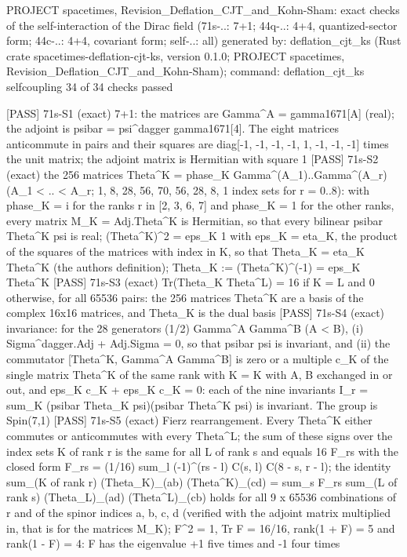 \documentclass[
  10pt,
]{article}
\newenvironment{Shaded}{}{}
\newcommand{\NormalTok}[1]{#1}
\begin{document}
\begin{Shaded}
\begin{Highlighting}[]
\NormalTok{PROJECT spacetimes, Revision\_Deflation\_CJT\_and\_Kohn{-}Sham: exact checks of the self{-}interaction of the Dirac field (71s{-}..: 7+1; 44q{-}..: 4+4, quantized{-}sector form; 44c{-}..: 4+4, covariant form; self{-}..: all)}
\NormalTok{generated by: deflation\_cjt\_ks (Rust crate spacetimes{-}deflation{-}cjt{-}ks, version 0.1.0; PROJECT spacetimes, Revision\_Deflation\_CJT\_and\_Kohn{-}Sham); command: deflation\_cjt\_ks selfcoupling}
\NormalTok{34 of 34 checks passed}

\NormalTok{[PASS] 71s{-}S1  (exact) 7+1: the matrices are Gamma\^{}A = gamma1671[A] (real); the adjoint is psibar = psi\^{}dagger gamma1671[4]. The eight matrices anticommute in pairs and their squares are diag[{-}1, {-}1, {-}1, {-}1, 1, {-}1, {-}1, {-}1] times the unit matrix; the adjoint matrix is Hermitian with square 1}
\NormalTok{[PASS] 71s{-}S2  (exact) the 256 matrices Theta\^{}K = phase\_K Gamma\^{}(A\_1)..Gamma\^{}(A\_r) (A\_1 \textless{} .. \textless{} A\_r; 1, 8, 28, 56, 70, 56, 28, 8, 1 index sets for r = 0..8): with phase\_K = i for the ranks r in [2, 3, 6, 7] and phase\_K = 1 for the other ranks, every matrix M\_K = Adj.Theta\^{}K is Hermitian, so that every bilinear psibar Theta\^{}K psi is real; (Theta\^{}K)\^{}2 = eps\_K 1 with eps\_K = eta\_K, the product of the squares of the matrices with index in K, so that Theta\_K = eta\_K Theta\^{}K (the author\textquotesingle{}s definition); Theta\_K := (Theta\^{}K)\^{}({-}1) = eps\_K Theta\^{}K}
\NormalTok{[PASS] 71s{-}S3  (exact) Tr(Theta\_K Theta\^{}L) = 16 if K = L and 0 otherwise, for all 65536 pairs: the 256 matrices Theta\^{}K are a basis of the complex 16x16 matrices, and Theta\_K is the dual basis}
\NormalTok{[PASS] 71s{-}S4  (exact) invariance: for the 28 generators (1/2) Gamma\^{}A Gamma\^{}B (A \textless{} B), (i) Sigma\^{}dagger.Adj + Adj.Sigma = 0, so that psibar psi is invariant, and (ii) the commutator [Theta\^{}K, Gamma\^{}A Gamma\^{}B] is zero or a multiple c\_K of the single matrix Theta\^{}K\textquotesingle{} of the same rank with K\textquotesingle{} = K with A, B exchanged in or out, and eps\_K c\_K + eps\_K\textquotesingle{} c\_K\textquotesingle{} = 0: each of the nine invariants I\_r = sum\_K (psibar Theta\_K psi)(psibar Theta\^{}K psi) is invariant. The group is Spin(7,1)}
\NormalTok{[PASS] 71s{-}S5  (exact) Fierz rearrangement. Every Theta\^{}K either commutes or anticommutes with every Theta\^{}L; the sum of these signs over the index sets K of rank r is the same for all L of rank s and equals 16 F\_rs with the closed form F\_rs = (1/16) sum\_l ({-}1)\^{}(rs {-} l) C(s, l) C(8 {-} s, r {-} l); the identity sum\_(K of rank r) (Theta\_K)\_(ab) (Theta\^{}K)\_(cd) = sum\_s F\_rs sum\_(L of rank s) (Theta\_L)\_(ad) (Theta\^{}L)\_(cb) holds for all 9 x 65536 combinations of r and of the spinor indices a, b, c, d (verified with the adjoint matrix multiplied in, that is for the matrices M\_K); F\^{}2 = 1, Tr F = 16/16, rank(1 + F) = 5 and rank(1 {-} F) = 4: F has the eigenvalue +1 five times and {-}1 four times}

\end{Highlighting}
\end{Shaded}
\end{document}
